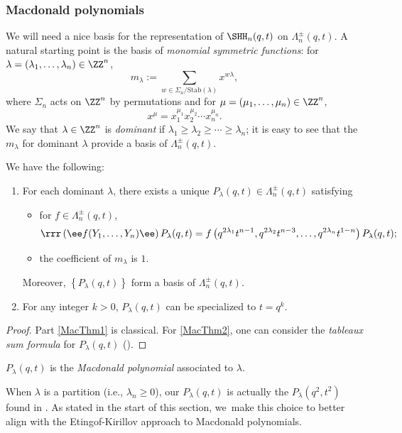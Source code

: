 \subsubsection{Macdonald polynomials}
We will need a nice basis for the representation of $\SHH_n(q,t)$ on $\Lambda^\pm_n(q,t)$.
A natural starting point is the basis of \textit{monomial symmetric functions}: for $\lambda=(\lambda_1,\ldots, \lambda_n)\in\ZZ^n$,
\[
m_\lambda:=\sum_{w\in\Sigma_n/\mathrm{Stab}(\lambda)}x^{w\lambda},
\]
where $\Sigma_n$ acts on $\ZZ^n$ by permutations and for $\mu=(\mu_1,\ldots, \mu_n)\in\ZZ^n$,
\[
x^\mu=x_1^{\mu_1}x_2^{\mu_2}\cdots x_n^{\mu_n}.
\]
We say that $\lambda\in\ZZ^n$ is \textit{dominant} if $\lambda_1\ge\lambda_2\ge\cdots\ge\lambda_n$; it is easy to see that the $m_\lambda$ for dominant $\lambda$ provide a basis of $\Lambda_n^\pm(q,t)$.
\begin{thm}\label{MacThm}
We have the following:
\begin{enumerate}
\item\label{MacThm1} For each dominant $\lambda$, there exists a unique $P_\lambda(q,t)\in\Lambda_n^\pm(q,t)$ satisfying
\begin{itemize}
\item for $f\in\Lambda_n^\pm(q,t)$,
\[
\rrr\left(\ee f(Y_1,\ldots, Y_n)\ee \right)P_\lambda(q,t)=f\left(q^{2\lambda_1}t^{n-1},q^{2\lambda_2}t^{n-3},\ldots,q^{2\lambda_n}t^{1-n}\right)P_\lambda(q,t);
\]
\item the coefficient of $m_\lambda$ is $1$.
\end{itemize}
Moreover, $\left\{ P_\lambda(q,t) \right\}$ form a basis of $\Lambda_n^\pm(q,t)$.
\item\label{MacThm2} For any integer $k>0$, $P_\lambda(q,t)$ can be specialized to $t=q^k$.
\end{enumerate}
\end{thm}

\begin{proof}
Part \eqref{MacThm1} is classical.
For \eqref{MacThm2}, one can consider the \textit{tableaux sum formula} for $P_\lambda(q,t)$ (\cf \cite[VI.6]{MacBook}).
\end{proof}

$P_\lambda(q,t)$ is the \textit{Macdonald polynomial} associated to $\lambda$.

\begin{rem}
When $\lambda$ is a partition (i.e., $\lambda_n\ge 0$), our $P_\lambda(q,t)$ is actually the $P_\lambda(q^2,t^2)$ found in \cite{MacBook}.
As stated in the start of this section, we~make this choice to better align with the Etingof-Kirillov approach to Macdonald polynomials.
\end{rem}

